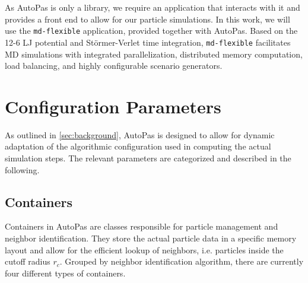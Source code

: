 As AutoPas is only a library, we require an application that interacts with it and provides a front end to allow for our particle simulations. In this work, we will use the \texttt{md-flexible} application, provided together with AutoPas. Based on the 12-6 LJ potential and Störmer-Verlet time integration, \texttt{md-flexible} facilitates MD simulations with integrated parallelization, distributed memory computation, load balancing, and highly configurable scenario generators.


\section{Configuration Parameters}
\label{sec:config_params}

As outlined in \autoref{sec:background}, AutoPas is designed to allow for dynamic adaptation of the algorithmic configuration used in computing the actual simulation steps. The relevant parameters are categorized and described in the following.

\subsection{Containers}

Containers in AutoPas are classes responsible for particle management and neighbor identification. They store the actual particle data in a specific memory layout and allow for the efficient lookup of neighbors, i.e. particles inside the cutoff radius $r_c$. Grouped by neighbor identification algorithm, there are currently four different types of containers.

